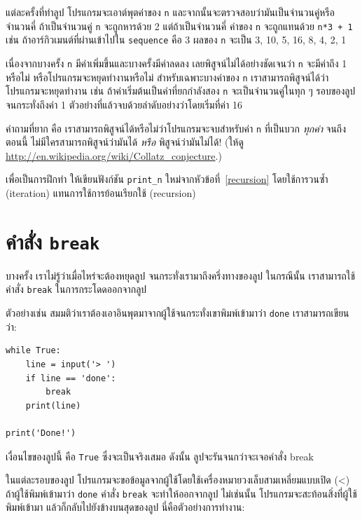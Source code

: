 แต่ละครั้งที่ทำลูป โปรแกรมจะเอาต์พุตค่าของ {\tt n} และจากนั้นจะตรวจสอบว่ามันเป็นจำนวนคู่หรือจำนวนคี่
ถ้าเป็นจำนวนคู่ {\tt n} จะถูกหารด้วย 2 แต่ถ้าเป็นจำนวนคี่ ค่าของ {\tt n} จะถูกแทนด้วย {\tt n*3 + 1}
เช่น ถ้าอาร์กิวเมนต์ที่ผ่านเข้าไปใน {\tt sequence} คือ 3 ผลของ {\tt n} จะเป็น
3, 10, 5, 16, 8, 4, 2, 1

เนื่องจากบางครั้ง {\tt n} มีค่าเพิ่มขึ้นและบางครั้งมีค่าลดลง เลยพิสูจน์ไม่ได้อย่างชัดเจนว่า {\tt n} จะมีค่าถึง 1 หรือไม่ หรือโปรแกรมจะหยุดทำงานหรือไม่ สำหรับเฉพาะบางค่าของ {\tt n} เราสามารถพิสูจน์ได้ว่าโปรแกรมจะหยุดทำงาน เช่น ถ้าค่าเริ่มต้นเป็นค่าที่ยกกำลังสอง {\tt n} 
จะเป็นจำนวนคู่ในทุก ๆ รอบของลูปจนกระทั่งถึงค่า 1  ตัวอย่างที่แล้วจบด้วยลำดับอย่างว่าโดยเริ่มที่ค่า 16

คำถามที่ยาก คือ เราสามารถพิสูจน์ได้หรือไม่ว่าโปรแกรมจะจบสำหรับค่า {\tt n} ที่เป็นบวก {\em ทุกค่า}
จนถึงตอนนี้ ไม่มีใครสามารถพิสูจน์ว่ามันได้ {\em หรือ} พิสูจน์ว่ามันไม่ได้! (ให้ดู
\url{http://en.wikipedia.org/wiki/Collatz_conjecture}.)

เพื่อเป็นการฝึกทำ ให้เขียนฟังก์ชัน \verb"print_n" ใหม่จากหัวข้อที่~\ref{recursion}
โดยใช้การวนซ้ำ (iteration) แทนการใช้การย้อนเรียกใช้ (recursion)


\section{คำสั่ง {\tt break}}

บางครั้ง เราไม่รู้ว่าเมื่อไหร่จะต้องหยุดลูป จนกระทั่งเรามาถึงครึ่งทางของลูป ในกรณีนั้น
เราสามารถใช้คำสั่ง {\tt break} ในการกระโดดออกจากลูป

ตัวอย่างเช่น สมมติว่าเราต้องเอาอินพุตมาจากผู้ใช้จนกระทั่งเขาพิมพ์เข้ามาว่า {\tt done}
เราสามารถเขียนว่า:

\begin{verbatim}
while True:
    line = input('> ')
    if line == 'done':
        break
    print(line)

print('Done!')
\end{verbatim}
%
เงื่อนไขของลูปนี้ คือ {\tt True} ซึ่งจะเป็นจริงเสมอ 
ดังนั้น ลูปจะรันจนกว่าจะเจอคำสั่ง break

ในแต่ละรอบของลูป โปรแกรมจะขอข้อมูลจากผู้ใช้โดยใช้เครื่องหมายวงเล็บสามเหลี่ยมแบบเปิด (<) 
ถ้าผู้ใช้พิมพ์เข้ามาว่า {\tt done} คำสั่ง {\tt break} จะทำให้ออกจากลูป  ไม่เช่นนั้น
โปรแกรมจะสะท้อนสิ่งที่ผู้ใช้พิมพ์เข้ามา แล้วก็กลับไปยังข้างบนสุดของลูป นี่คือตัวอย่างการทำงาน:

